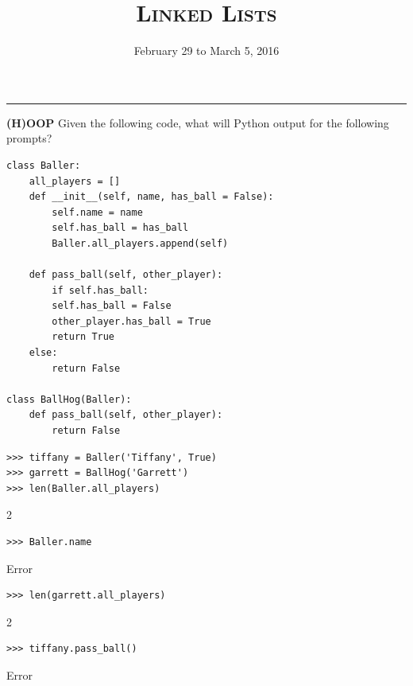 \documentclass{exam}
\title{\textsc{Linked Lists}}
\date{February 29 to March 5, 2016}
\begin{document}
\maketitle
\rule{\textwidth}{0.15em}
\fontsize{12}{15}\selectfont




\begin{questions}
\begin{blocksection}
\question \textbf{(H)OOP} \newline
Given the following code, what will Python output for the following prompts? 

\begin{lstlisting}
class Baller:
    all_players = []
    def __init__(self, name, has_ball = False):
        self.name = name
        self.has_ball = has_ball
        Baller.all_players.append(self)
    
    def pass_ball(self, other_player):
        if self.has_ball:
        self.has_ball = False
        other_player.has_ball = True
        return True
    else:
        return False

class BallHog(Baller):
    def pass_ball(self, other_player):  
        return False    
\end{lstlisting}

\begin{lstlisting}
>>> tiffany = Baller('Tiffany', True)
>>> garrett = BallHog('Garrett')
>>> len(Baller.all_players)
\end{lstlisting}
\begin{solution}[.2in]
2
\end{solution}
\end{blocksection}

\begin{blocksection}
\begin{lstlisting}
>>> Baller.name
\end{lstlisting}
\begin{solution}[.2in]
Error
\end{solution}

\begin{lstlisting}
>>> len(garrett.all_players)
\end{lstlisting}
\begin{solution}[.2in]
2
\end{solution}

\begin{lstlisting}
>>> tiffany.pass_ball()
\end{lstlisting}
\begin{solution}[.2in]
Error
\end{solution}


\end{blocksection}
\end{questions}
\end{document}
